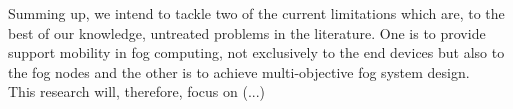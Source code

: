 \noindent\tab Summing up, we intend to tackle two of the current limitations which are, to the best of our knowledge, untreated problems in the literature. One is to provide support mobility in fog computing, not exclusively to the end devices but also to the fog nodes and the other is to achieve multi-objective fog system design.\\
\noindent\tab This research will, therefore, focus on (...)\\[50pt]

